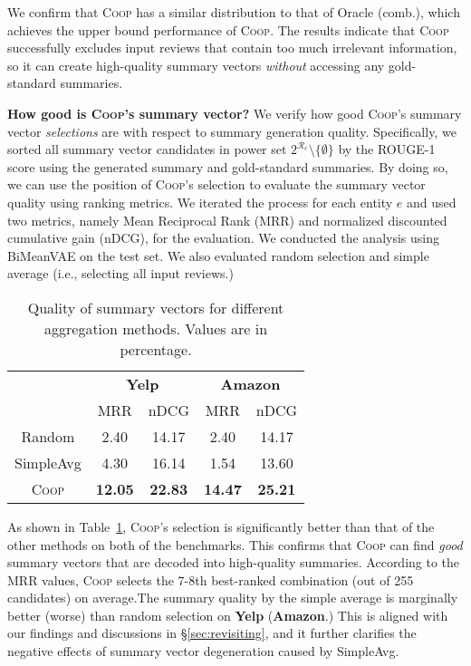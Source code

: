 \documentclass[11pt]{article}
\newcommand{\aggname}{\textsc{Coop}}
\newcommand{\name}{\mbox{\sc BiMeanVAE}}
\newcommand{\simpleavg}{\mbox{SimpleAvg}}
\newcommand{\yelp}{\mbox{\bf Yelp}}
\newcommand{\amazon}{\mbox{\bf Amazon}}
\newcommand{\hl}[1]{#1}
\begin{document}
We confirm that \aggname{} has a similar distribution to that of Oracle (comb.), which achieves the upper bound performance of \aggname. The results indicate that \aggname{} successfully excludes input reviews that contain too much irrelevant information, so it can create high-quality summary vectors {\em without} accessing any gold-standard summaries.

\noindent
{\bf How good is \aggname's summary vector?}
We verify how good \aggname's summary vector {\em selections} are with respect to summary generation quality.
Specifically, we sorted all summary vector candidates in power set $2^{\mathcal{R}_e}\setminus\{\emptyset\}$ by the ROUGE-1 score using the generated summary and gold-standard summaries. By doing so, we can use the position of \aggname's selection to evaluate the summary vector quality using ranking metrics. 
We iterated the process for each entity $e$ and used two metrics, namely Mean Reciprocal Rank (MRR) and normalized discounted cumulative gain (nDCG)\cite{schutze2008introduction}, for the evaluation.
We conducted the analysis using \name{} on the test set.
We also evaluated random selection and simple average (i.e., selecting all input reviews.)

\begin{table}[t]
    \centering
    \small
    \begin{tabular}{c|cccc}
    \toprule
        & \multicolumn{2}{c}{\yelp{}} & \multicolumn{2}{c}{\amazon{}}\\
        & MRR & nDCG & MRR & nDCG \\\midrule
        Random & 2.40 & 14.17 & 2.40 & 14.17 \\
        \simpleavg & 4.30 & 16.14 & 1.54 & 13.60\\
        \aggname{} & \textbf{12.05} & \textbf{22.83} & \textbf{14.47} & \textbf{25.21} \\
    \bottomrule
    \end{tabular}
    \caption{Quality of summary vectors for different aggregation methods. \hl{Values are in percentage.}}\label{tab:agg_rank}
\end{table}

As shown in Table~\ref{tab:agg_rank}, \aggname's selection is significantly better than that of the other methods on both of the benchmarks. This confirms that \aggname{} can find {\em good} summary vectors that are decoded into high-quality summaries.
According to the MRR values, \aggname{} selects the 7-8th best-ranked combination (out of 255 candidates) on average.The summary quality by the simple average is marginally better (worse) than random selection on \yelp{} (\amazon.)
This is aligned with our findings and discussions in \S\ref{sec:revisiting}, and it further clarifies the negative effects of summary vector degeneration caused by \simpleavg.
\end{document}
